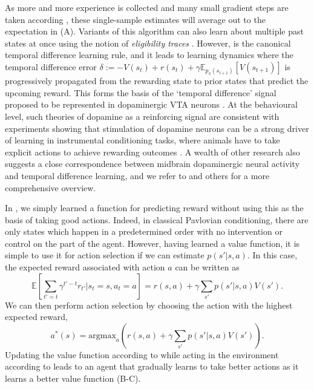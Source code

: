 As more and more experience is collected and many small gradient steps are taken according , these single-sample estimates will average out to the expectation in  (A).
Variants of this algorithm can also learn about multiple past states at once using the notion of \emph{eligibility traces} \citep{sutton2018reinforcement}.
However,  is the canonical temporal difference learning rule, and it leads to learning dynamics where the temporal difference error $\delta := - V(s_t) + r(s_t) + \gamma \mathbb{E}_{p_\pi(s_{t+1})} \left [ V(s_{t+1}) \right ]$ is progressively propagated from the rewarding state to prior states that predict the upcoming reward.
This forms the basis of the `temporal difference' signal proposed to be represented in dopaminergic VTA neurons \citep{schultz1997neural}.
At the behavioural level, such theories of dopamine as a reinforcing signal are consistent with experiments showing that stimulation of dopamine neurons can be a strong driver of learning in instrumental conditioning tasks, where animals have to take explicit actions to achieve rewarding outcomes \citep{olds1954positive, tsai2009phasic}.
A wealth of other research also suggests a close correspondence between midbrain dopaminergic neural activity and temporal difference learning, and we refer to \citet{niv2009reinforcement} and others for a more comprehensive overview.



In , we simply learned a function for predicting reward without using this as the basis of taking good actions.
Indeed, in classical Pavlovian conditioning, there are only states which happen in a predetermined order with no intervention or control on the part of the agent.
However, having learned a value function, it is simple to use it for action selection if we can estimate $p(s' | s, a)$.
In this case, the expected reward associated with action $a$ can be written as
\begin{equation}
    \mathbb{E} \left [\sum_{t' = t} \gamma^{t'-t} r_{t'} | s_t = s, a_t = a \right ] = r(s, a) + \gamma \sum_{s'} p( s' | s, a) V(s').
\end{equation}
We can then perform action selection by choosing the action with the highest expected reward,
\begin{equation}
    \label{eq:value_action_selection}
    a^*(s) = \text{argmax}_{a} \left ( r(s, a) + \gamma \sum_{s'} p(s' | s, a) V(s') \right ).
\end{equation}
Updating the value function according to  while acting in the environment according to  leads to an agent that gradually learns to take better actions as it learns a better value function (B-C).

